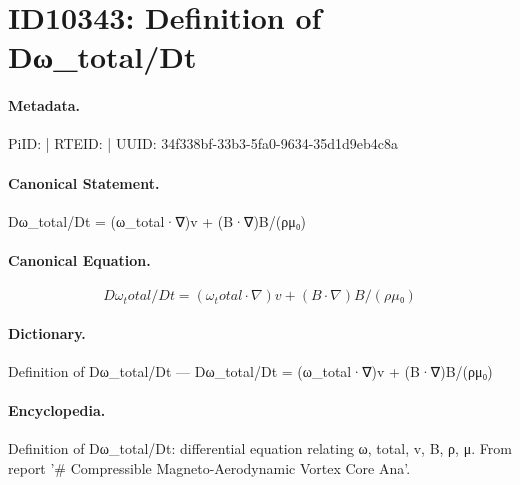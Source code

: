 \section*{ID10343: Definition of Dω\_total/Dt}
\paragraph{Metadata.}
PiID:  | RTEID:  | UUID: 34f338bf-33b3-5fa0-9634-35d1d9eb4c8a

\paragraph{Canonical Statement.}
Dω\_total/Dt = (ω\_total·∇)v + (B·∇)B/(ρμ₀)

\paragraph{Canonical Equation.}
\[
Dω_total/Dt = (ω_total·∇)v + (B·∇)B/(ρμ₀)
\]

\paragraph{Dictionary.}
Definition of Dω\_total/Dt — Dω\_total/Dt = (ω\_total·∇)v + (B·∇)B/(ρμ₀)

\paragraph{Encyclopedia.}
Definition of Dω\_total/Dt: differential equation relating ω, total, v, B, ρ, μ. From report '\# Compressible Magneto-Aerodynamic Vortex Core Ana'.
